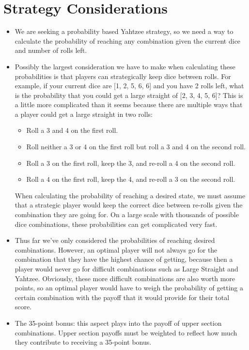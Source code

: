 \documentclass[12pt,a4paper]{article}
\begin{document}
\clearpage

\section{Strategy Considerations}

\begin{itemize}
    \item We are seeking a probability based Yahtzee strategy, so we need a way to calculate the probability of reaching any combination given the current dice and number of rolls left.
    \item Possibly the largest consideration we have to make when calculating these probabilities is that players can strategically keep dice between rolls. For example, if your current dice are [1, 2, 5, 6, 6] and you have 2 rolls left, what is the probability that you could get a large straight of [2, 3, 4, 5, 6]? This is a little more complicated than it seems because there are multiple ways that a player could get a large straight in two rolls:
    \begin{itemize}
        \item Roll a 3 and 4 on the first roll.
        \item Roll neither a 3 or 4 on the first roll but roll a 3 and 4 on the second roll.
        \item Roll a 3 on the first roll, keep the 3, and re-roll a 4 on the second roll.
        \item Roll a 4 on the first roll, keep the 4, and re-roll a 3 on the second roll.
    \end{itemize}
    When calculating the probability of reaching a desired state, we must assume that a strategic player would keep the correct dice between re-rolls given the combination they are going for. On a large scale with thousands of possible dice combinations, these probabilities can get complicated very fast.
    \item Thus far we've only considered the probabilities of reaching desired combinations. However, an optimal player will not always go for the combination that they have the highest chance of getting, because then a player would never go for difficult combinations such as Large Straight and Yahtzee. Obviously, these more difficult combinations are also worth more points, so an optimal player would have to weigh the probability of getting a certain combination with the payoff that it would provide for their total score.
    \item The 35-point bonus: this aspect plays into the payoff of upper section combinations. Upper section payoffs must be weighted to reflect how much they contribute to receiving a 35-point bonus.
\end{itemize}
\end{document}
